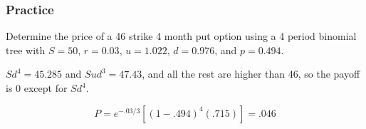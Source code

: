 \documentclass{beamer}
\theoremstyle{plain}
\theoremstyle{definition}
\theoremstyle{remark}
\begin{document}
\begin{frame}
\frametitle{Practice}

Determine the price of a 46 strike 4 month put option using a 4 period binomial tree with $S = 50$, $r = 0.03$, $u = 1.022$, $d = 0.976$, and $p = 0.494$. 

\vspace{.1 cm}
\pause  $Sd^4 = 45.285$ and $Sud^3 = 47.43$, and all the rest are higher than 46, so the payoff is 0 except for $Sd^4$. 

\vspace{.1 cm}

\[P = e^{-.03/3}[(1-.494)^4(.715)] = .046\]

\end{frame}
\end{document}
